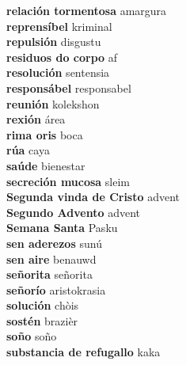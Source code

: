 \textbf{ relación tormentosa  } amargura \\
\textbf{ reprensíbel  } kriminal \\
\textbf{ repulsión  } disgustu \\
\textbf{ residuos do corpo  } af \\
\textbf{ resolución  } sentensia \\
\textbf{ responsábel  } responsabel \\
\textbf{ reunión  } kolekshon \\
\textbf{ rexión  } área \\
\textbf{ rima oris  } boca \\
\textbf{ rúa  } caya \\
\textbf{ saúde  } bienestar \\
\textbf{ secreción mucosa  } sleim \\
\textbf{ Segunda vinda de Cristo  } advent \\
\textbf{ Segundo Advento  } advent \\
\textbf{ Semana Santa  } Pasku \\
\textbf{ sen aderezos  } sunú \\
\textbf{ sen aire  } benauwd \\
\textbf{ señorita  } señorita \\
\textbf{ señorío  } aristokrasia \\
\textbf{ solución  } chòis \\
\textbf{ sostén  } brazièr \\
\textbf{ soño  } soño \\
\textbf{ substancia de refugallo  } kaka \\
